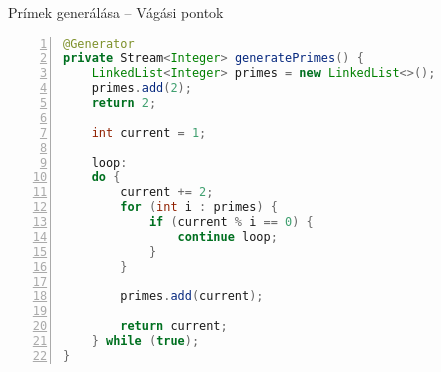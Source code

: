 \begin{frame}[fragile]{Prímek generálása -- Vágási pontok}
\begin{center}
\begin{lstlisting}[language=java, xleftmargin=15pt,
        basicstyle=\fontsize{7}{9}\selectfont,
        numbers=left,
        numbersep=5pt, escapechar=!,
        linebackgroundcolor={
            \btLstHL<1>{30} % No highlighting
            \btLstHL<2>{5, 20}
            \btLstHL<3>{10, 21}
            \btLstHL<4>{14}
            \btLstHL<5>{12-16}
        }]
@Generator
private Stream<Integer> generatePrimes() {
    LinkedList<Integer> primes = new LinkedList<>();
    primes.add(2);
    return 2;

    int current = 1;

    loop:
    do {
        current += 2;
        for (int i : primes) {
            if (current % i == 0) {
                continue loop;
            }
        }

        primes.add(current);

        return current;
    } while (true);
}
\end{lstlisting}
\end{center}
\par
\end{frame}



